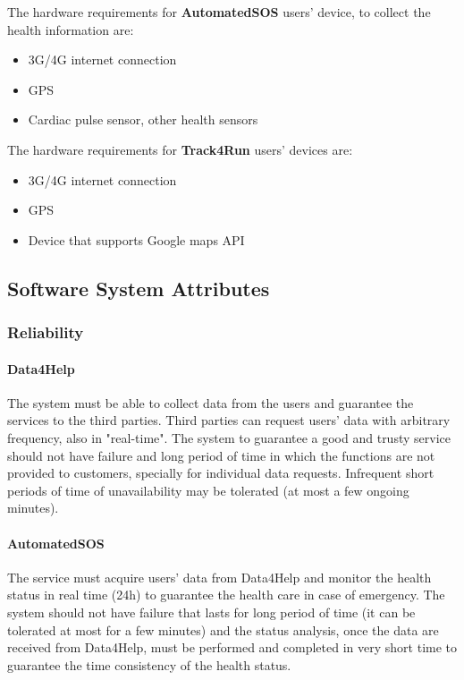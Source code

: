 \documentclass[a4paper]{article}
\begin{document}
\noindent The hardware requirements for \textbf{AutomatedSOS} users' device, to collect the health information are:
\begin{itemize}
    \item 3G/4G internet connection
    \item GPS
    \item Cardiac pulse sensor, other health sensors
\end{itemize}
\noindent The hardware requirements for \textbf{Track4Run} users' devices are:
\begin{itemize}
    \item 3G/4G internet connection
    \item GPS
    \item Device that supports Google maps API
\end{itemize}

\clearpage


\subsection{Software System Attributes}

\subsubsection{Reliability} 

\paragraph{Data4Help} The system must be able to collect data from the users and guarantee the services to the third parties.
Third parties can request users' data with arbitrary frequency, also in "real-time". The system to guarantee a good and trusty service should not have failure and long period of time in which the functions are not provided to customers, specially for individual data requests. Infrequent short periods of time of unavailability may be tolerated (at most a few ongoing minutes).

\paragraph{AutomatedSOS} The service must acquire users' data from Data4Help and monitor the health status in real time (24h) to guarantee the health care in case of emergency. The system should not have failure that lasts for long period of time (it can be tolerated at most for a few minutes) and the status analysis, once the data are received from Data4Help, must be performed and completed in very short time to guarantee the time consistency of the health status.
\end{document}
